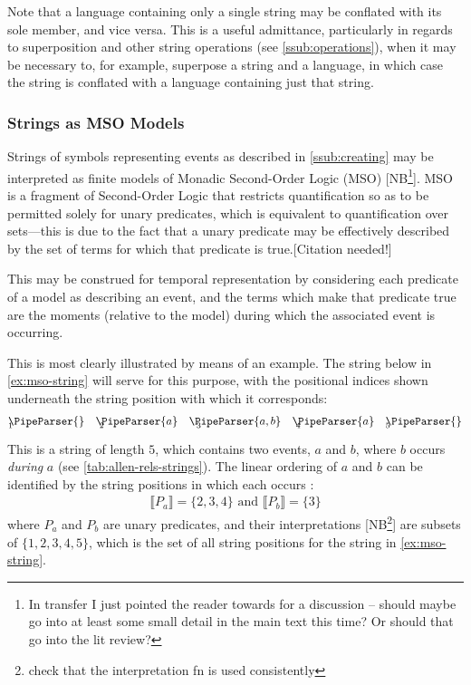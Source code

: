 \documentclass[a4paper,12pt,leqno]{article}
\newcommand{\vph}[1]{\vphantom{#1}}
\newcommand{\ebox}[1]{\fbox{$\vph{'(),}#1$}}
\newcommand{\EventString}[1]{
	\renewcommand*{\do}[1]{\ebox{##1}}%
	\PipeParser{#1}
}
\newcommand{\citeneeded}[1][]{{\color{red}[Citation needed!#1]}}
\newcommand{\selfnote}[1]{{\color{red}[NB\footnote{{\color{red}#1}}]}}
\newcommand{\nb}{\selfnote}
\begin{document}
Note that a language containing only a single string may be conflated with its sole member, and vice versa. This is a useful admittance, particularly in regards to superposition and other string operations (see \cref{ssub:operations}), when it may be necessary to, for example, superpose a string and a language, in which case the string is conflated with a language containing just that string. \label{pt:conflation}

\subsubsection{Strings as MSO Models}

Strings of symbols representing events as described in \cref{ssub:creating} may be interpreted as finite models of Monadic Second-Order Logic (MSO) \nb{In transfer I just pointed the reader towards \citet{Libkin2004} for a discussion -- should maybe go into at least some small detail in the main text this time? Or should that go into the lit review?}. MSO is a fragment of Second-Order Logic that restricts quantification so as to be permitted solely for unary predicates, which is equivalent to quantification over sets---this is due to the fact that a unary predicate may be effectively described by the set of terms for which that predicate is true.\citeneeded{}

This may be construed for temporal representation by considering each predicate of a model as describing an event, and the terms which make that predicate true are the moments (relative to the model) during which the associated event is occurring.

This is most clearly illustrated by means of an example. The string below in \cref{ex:mso-string} will serve for this purpose, with the positional indices shown underneath the string position with which it corresponds:
\begin{alignat}{5}\label{ex:mso-string}
	&\EventString{{}} && \EventString{a} && \EventString{a,b} && \EventString{a} && \EventString{{}}\\[-1.2em]
	&{\scriptstyle 1} && {\scriptstyle ~2} && {\scriptstyle ~~3} && {\scriptstyle ~4} && {\scriptstyle 5}\notag
\end{alignat}
This is a string of length $5$, which contains two events, $a$ and $b$, where $b$ occurs \textit{during} $a$ (see \cref{tab:allen-rels-strings}). The linear ordering of $a$ and $b$ can be identified by the string positions in which each occurs \citep{fernando2016regular,Fernando2018}:
\begin{align}
	\llbracket P_a \rrbracket = \{2,3,4\} \text{ and } \llbracket P_b \rrbracket = \{3\}
\end{align}
where $P_a$ and $P_b$ are unary predicates, and their interpretations \nb{check that the interpretation fn is used consistently} are subsets of $\{1,2,3,4,5\}$, which is the set of all string positions for the string in \cref{ex:mso-string}.
\end{document}
